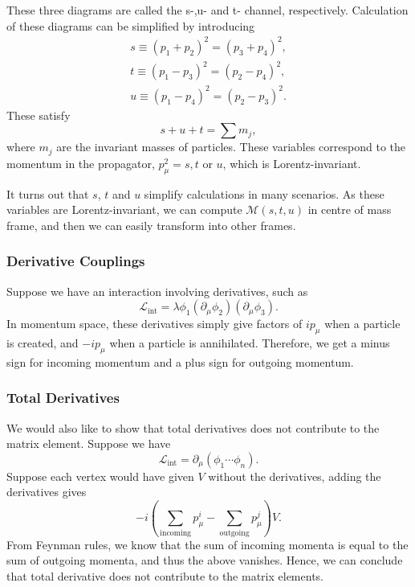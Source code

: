 \documentclass[11pt]{article}
\theoremstyle{definition}
\begin{document}
These three diagrams are called the s-,u- and t- channel, respectively. Calculation of these diagrams can be simplified by introducing
\begin{equation}
    \begin{aligned}
        s \equiv (p_1+p_2)^2 = (p_3+p_4)^2,\\
        t \equiv (p_1-p_3)^2 = (p_2-p_4)^2,\\
        u \equiv (p_1-p_4)^2 = (p_2-p_3)^2.
    \end{aligned}
\end{equation}
These satisfy
\begin{equation}
    s + u + t = \sum m_j,
\end{equation}
where $m_j$ are the invariant masses of particles. These variables correspond to the momentum in the propagator, $p_\mu^2 = s, t$ or $u$, which is Lorentz-invariant.

It turns out that $s$, $t$ and $u$ simplify calculations in many scenarios. As these variables are Lorentz-invariant, we can compute $\mathcal{M}(s,t,u)$ in centre of mass frame, and then we can easily transform into other frames.

\subsubsection{Derivative Couplings}
Suppose we have an interaction involving derivatives, such as
\begin{equation}
    \mathcal{L}_\text{int} = \lambda \phi_1 (\partial_\mu\phi_2)(\partial_
\mu\phi_3).
\end{equation}
In momentum space, these derivatives simply give factors of $ip_\mu$ when a particle is created, and $-ip_\mu$ when a particle is annihilated. Therefore, we get a minus sign for incoming momentum and a plus sign for outgoing momentum.

\subsubsection{Total Derivatives}
We would also like to show that total derivatives does not contribute to the matrix element. Suppose we have
\begin{equation}
    \mathcal{L}_\text{int} = \partial_\mu(\phi_1\cdots\phi_n).
\end{equation}
Suppose each vertex would have given $V$ without the derivatives, adding the derivatives gives
\begin{equation}
    -i(\sum_\text{incoming} p^i_\mu - \sum_\text{outgoing}p^j_\mu) V.
\end{equation}
From Feynman rules, we know that the sum of incoming momenta is equal to the sum of outgoing momenta, and thus the above vanishes. Hence, we can conclude that total derivative does not contribute to the matrix elements.
\end{document}
